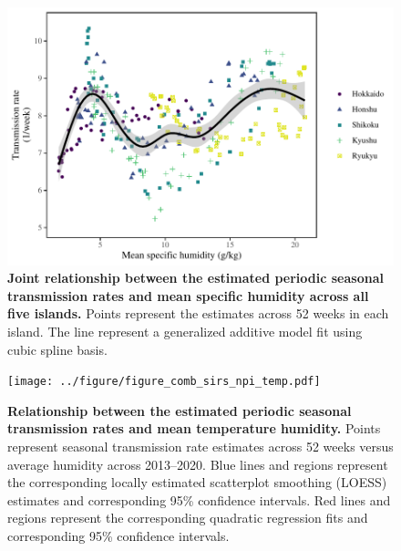 \documentclass[12pt]{article}
\begin{document}
\pagebreak

\begin{figure}[!pth]
\includegraphics[width=\textwidth]{../figure/figure_joint_climate.pdf}
\caption{
\textbf{Joint relationship between the estimated periodic seasonal transmission rates and mean specific humidity across all five islands.}
Points represent the estimates across 52 weeks in each island.
The line represent a generalized additive model fit using cubic spline basis.
}
\end{figure}

\pagebreak

\begin{figure}[!pth]
\texttt{[image: ../figure/figure\_comb\_sirs\_npi\_temp.pdf]}
\caption{
\textbf{Relationship between the estimated periodic seasonal transmission rates and mean temperature humidity.}
Points represent seasonal transmission rate estimates across 52 weeks versus average humidity across 2013--2020.
Blue lines and regions represent the corresponding locally estimated scatterplot smoothing (LOESS) estimates and corresponding 95\%  confidence intervals.
Red lines and regions represent the corresponding quadratic regression fits and corresponding 95\% confidence intervals.
}
\end{figure}

\pagebreak
\end{document}
